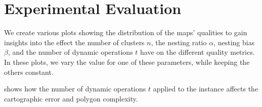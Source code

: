 \section{Experimental Evaluation}
\label{sect:experimental-evaluation}

We create various plots showing the distribution of the maps' qualities to gain insights into the effect the number of clusters $n$, the nesting ratio $\alpha$, nesting bias $\beta$, and the number of dynamic operations $t$ have on the different quality metrics.
In these plots, we vary the value for one of these parameters, while keeping the others constant.

 shows how the number of dynamic operations $t$ applied to the instance affects the cartographic error and polygon complexity.


